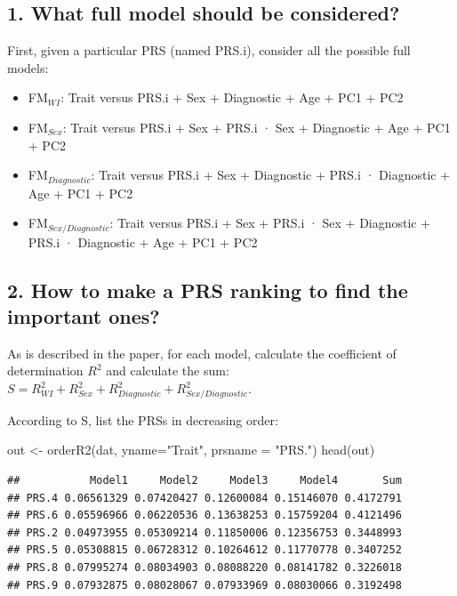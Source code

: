 \documentclass[
]{article}
\newenvironment{Shaded}{\begin{snugshade}}{\end{snugshade}}
\newcommand{\AttributeTok}[1]{\textcolor[rgb]{0.77,0.63,0.00}{#1}}
\newcommand{\FunctionTok}[1]{\textcolor[rgb]{0.00,0.00,0.00}{#1}}
\newcommand{\NormalTok}[1]{#1}
\newcommand{\OtherTok}[1]{\textcolor[rgb]{0.56,0.35,0.01}{#1}}
\newcommand{\StringTok}[1]{\textcolor[rgb]{0.31,0.60,0.02}{#1}}
\providecommand{\tightlist}{%
  \setlength{\itemsep}{0pt}\setlength{\parskip}{0pt}}
\begin{document}
\hypertarget{what-full-model-should-be-considered}{%
\subsection{1. What full model should be
considered?}\label{what-full-model-should-be-considered}}

First, given a particular PRS (named PRS.i), consider all the possible
full models:

\begin{itemize}
\tightlist
\item
  FM\(_{WI}\): Trait versus PRS.i + Sex + Diagnostic + Age + PC1 + PC2
\item
  FM\(_{Sex}\): Trait versus PRS.i + Sex + PRS.i · Sex + Diagnostic +
  Age + PC1 + PC2
\item
  FM\(_{Diagnostic}\): Trait versus PRS.i + Sex + Diagnostic + PRS.i ·
  Diagnostic + Age + PC1 + PC2
\item
  FM\(_{Sex/Diagnostic}\): Trait versus PRS.i + Sex + PRS.i · Sex +
  Diagnostic + PRS.i · Diagnostic + Age + PC1 + PC2
\end{itemize}

\hypertarget{how-to-make-a-prs-ranking-to-find-the-important-ones}{%
\subsection{2. How to make a PRS ranking to find the important
ones?}\label{how-to-make-a-prs-ranking-to-find-the-important-ones}}

As is described in the paper, for each model, calculate the coefficient
of determination \(R^2\) and calculate the sum:
\(S = R^2_{WI} + R^2_{Sex} + R^2_{Diagnostic} + R^2_{Sex/Diagnostic}\).

According to S, list the PRSs in decreasing order:

\begin{Shaded}
\begin{Highlighting}[]
\NormalTok{out }\OtherTok{\textless{}{-}} \FunctionTok{orderR2}\NormalTok{(dat, }\AttributeTok{yname=}\StringTok{"Trait"}\NormalTok{, }\AttributeTok{prsname =} \StringTok{"PRS."}\NormalTok{)}
\FunctionTok{head}\NormalTok{(out)}
\end{Highlighting}
\end{Shaded}

\begin{verbatim}
##           Model1     Model2     Model3     Model4       Sum
## PRS.4 0.06561329 0.07420427 0.12600084 0.15146070 0.4172791
## PRS.6 0.05596966 0.06220536 0.13638253 0.15759204 0.4121496
## PRS.2 0.04973955 0.05309214 0.11850006 0.12356753 0.3448993
## PRS.5 0.05308815 0.06728312 0.10264612 0.11770778 0.3407252
## PRS.8 0.07995274 0.08034903 0.08088220 0.08141782 0.3226018
## PRS.9 0.07932875 0.08028067 0.07933969 0.08030066 0.3192498
\end{verbatim}
\end{document}
